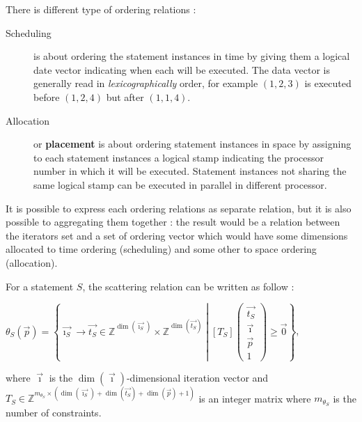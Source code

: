 \documentclass[paper=a4, fontsize=11pt]{scrartcl}
\numberwithin{equation}{section}        %
\numberwithin{figure}{section}          %
\numberwithin{table}{section}               %
\begin{document}
        There is different type of ordering relations :
        \begin{description}
            \item[Scheduling] is about ordering the statement instances in time by
                giving them a logical date vector indicating when each will be executed.
                The data vector is generally read in \textit{lexicographically} order, for example
                $(1,2,3)$ is executed before $(1,2,4)$ but after $(1,1,4)$.
            \item[Allocation] or \textbf{placement} is about ordering statement instances
                in space by assigning to each statement instances a logical stamp
                indicating the processor number in which it will be executed.
                Statement instances not sharing the same logical stamp can be
                executed in parallel in different processor.
        \end{description}

        It is possible to express each ordering relations as separate relation,
        but it is also possible to aggregating them together : the result would be
        a relation between the iterators set and a set of ordering vector which
        would have some dimensions allocated to time ordering (scheduling) and
        some other to space ordering (allocation).

        For a statement $S$, the scattering relation can be written as follow :
        \begin{center}
            $\theta_S(\vec{p}) = \left\{\vec{\imath_S} \to \vec{t_S} \in \mathbb{Z}^{\dim(\vec{\imath_S})}\times\mathbb{Z}^{\dim(\vec{t_S})}
            \middle|
            \left[T_S\right]\begin{pmatrix}\vec{t_S}\\ \vec{\imath} \\ \vec{p} \\ 1\end{pmatrix}
            \geq \vec{0}
            \right\}$,
        \end{center}
        where $\vec{\imath}$ is the $\dim(\vec{\imath})$-dimensional iteration vector
        and $T_S \in \mathbb{Z}^{m_{\theta_S}\times(\dim(\vec{\imath_S})+\dim(\vec{t_S})+\dim(\vec{p})+1)}$
        is an integer matrix where $m_{\theta_S}$ is the number of constraints.
\end{document}
